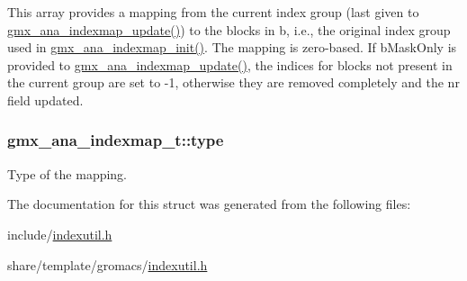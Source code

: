 \-This array provides a mapping from the current index group (last given to \hyperlink{include_2indexutil_8h_aeca832c56e9b3f19a049d65aff18cd69}{gmx\-\_\-ana\-\_\-indexmap\-\_\-update()}) to the blocks in {\ttfamily b}, i.\-e., the original index group used in \hyperlink{include_2indexutil_8h_a3230fa2b1cf35d0f9c654b6e34265c00}{gmx\-\_\-ana\-\_\-indexmap\-\_\-init()}. \-The mapping is zero-\/based. \-If {\ttfamily b\-Mask\-Only} is provided to \hyperlink{include_2indexutil_8h_aeca832c56e9b3f19a049d65aff18cd69}{gmx\-\_\-ana\-\_\-indexmap\-\_\-update()}, the indices for blocks not present in the current group are set to -\/1, otherwise they are removed completely and the {\ttfamily nr} field updated. \hypertarget{structgmx__ana__indexmap__t_a806f5456c1f90f4bb38c223aa4f81244}{
\subsubsection[{type}]{ {\bf gmx\-\_\-ana\-\_\-indexmap\-\_\-t\-::type}}}\label{structgmx__ana__indexmap__t_a806f5456c1f90f4bb38c223aa4f81244}
\-Type of the mapping. 

\-The documentation for this struct was generated from the following files\-:\begin{DoxyCompactItemize}
\item 
include/\hyperlink{include_2indexutil_8h}{indexutil.\-h}\item 
share/template/gromacs/\hyperlink{share_2template_2gromacs_2indexutil_8h}{indexutil.\-h}\end{DoxyCompactItemize}
